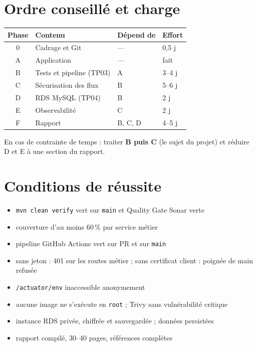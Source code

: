 \documentclass[12pt,a4paper]{article}
\newcommand{\code}[1]{\texttt{\small #1}}
\begin{document}
\section{Ordre conseill\'e et charge}

\begin{center}
\small
\begin{tabularx}{\textwidth}{@{}clXl@{}}
\toprule
\textbf{Phase} & \textbf{Contenu} & \textbf{D\'epend de} & \textbf{Effort} \\
\midrule
0 & Cadrage et Git & --- & 0,5 j \\
A & Application & --- & fait \\
B & Tests et pipeline (TP03) & A & 3--4 j \\
C & S\'ecurisation des flux & B & 5--6 j \\
D & RDS MySQL (TP04) & B & 2 j \\
E & Observabilit\'e & C & 2 j \\
F & Rapport & B, C, D & 4--5 j \\
\bottomrule
\end{tabularx}
\end{center}

En cas de contrainte de temps : traiter \textbf{B puis C} (le sujet du projet) et r\'eduire
D et E \`a une section du rapport.

\section{Conditions de r\'eussite}

\begin{itemize}[leftmargin=1.4em,itemsep=0.2em]
  \item[$\square$] \code{mvn clean verify} vert sur \code{main} et Quality Gate Sonar verte
  \item[$\square$] couverture d'au moins 60\,\% par service m\'etier
  \item[$\square$] pipeline GitHub Actions vert sur PR et sur \code{main}
  \item[$\square$] sans jeton : 401 sur les routes m\'etier ; sans certificat client : poign\'ee
        de main refus\'ee
  \item[$\square$] \code{/actuator/env} inaccessible anonymement
  \item[$\square$] aucune image ne s'ex\'ecute en \code{root} ; Trivy sans vuln\'erabilit\'e critique
  \item[$\square$] instance RDS priv\'ee, chiffr\'ee et sauvegard\'ee ; donn\'ees persist\'ees
  \item[$\square$] rapport compil\'e, 30--40 pages, r\'ef\'erences compl\`etes
\end{itemize}
\end{document}
